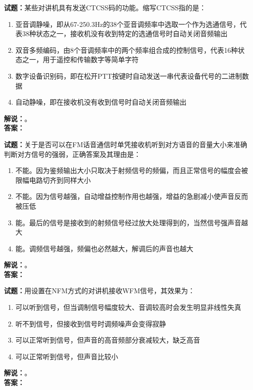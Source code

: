 \documentclass{ctexbook}
\begin{document}
\bigskip




\noindent\textbf{试题：}某些对讲机具有发送CTCSS码的功能。缩写CTCSS指的是：
\begin{enumerate}[leftmargin=3em]
\item 亚音调静噪，即从67-250.3Hz的38个亚音调频率中选取一个作为选通信号，代表38种状态之一，接收机没有收到特定的选通信号时自动关闭音频输出
\item 双音多频编码，由8个音调频率中的两个频率组合成的控制信号，代表16种状态之一，用于遥控和传输数字等简单字符
\item 数字设备识别码，即在松开PTT按键时自动发送一串代表设备代号的二进制数据
\item 自动静噪，即在接收机没有收到信号时自动关闭音频输出
\end{enumerate}
\noindent\textbf{解说：}\textbf{}。\\\noindent\textbf{答案：}

\bigskip




\noindent\textbf{试题：}关于是否可以在FM话音通信时单凭接收机听到对方语音的音量大小来准确判断对方信号的强弱，正确答案及其理由是：
\begin{enumerate}[leftmargin=3em]
\item 不能。因为鉴频输出大小只取决于射频信号的频偏，而且正常信号的幅度会被限幅电路切齐到同样大小
\item 不能。因为信号越强，自动增益控制作用也越强，增益的急剧减小使声音反而被压低
\item 能。最后的信号是接收到的射频信号经过放大处理得到的，当然信号强声音越大
\item 能。调频信号越强，频偏也必然越大，解调后的声音也越大
\end{enumerate}
\noindent\textbf{解说：}\textbf{}。\\\noindent\textbf{答案：}

\bigskip




\noindent\textbf{试题：}用设置在NFM方式的对讲机接收WFM信号，其效果为：
\begin{enumerate}[leftmargin=3em]
\item 可以听到信号，但当调制信号幅度较大、音调较高时会发生明显非线性失真
\item 听不到信号，但接收到信号时调频噪声会变得寂静
\item 可以正常听到信号，但声音的高音频部分衰减较大，缺乏高音
\item 可以正常听到信号，但声音比较小
\end{enumerate}
\noindent\textbf{解说：}\textbf{}。\\\noindent\textbf{答案：}
\end{document}
